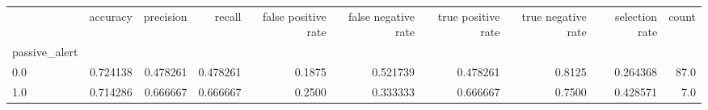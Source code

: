 \begin{tabular}{lrrrrrrrrr}
\toprule
{} &  accuracy &  precision &    recall &  false positive rate &  false negative rate &  true positive rate &  true negative rate &  selection rate &  count \\
passive\_alert &           &            &           &                      &                      &                     &                     &                 &        \\
\midrule
0.0           &  0.724138 &   0.478261 &  0.478261 &               0.1875 &             0.521739 &            0.478261 &              0.8125 &        0.264368 &   87.0 \\
1.0           &  0.714286 &   0.666667 &  0.666667 &               0.2500 &             0.333333 &            0.666667 &              0.7500 &        0.428571 &    7.0 \\
\bottomrule
\end{tabular}
